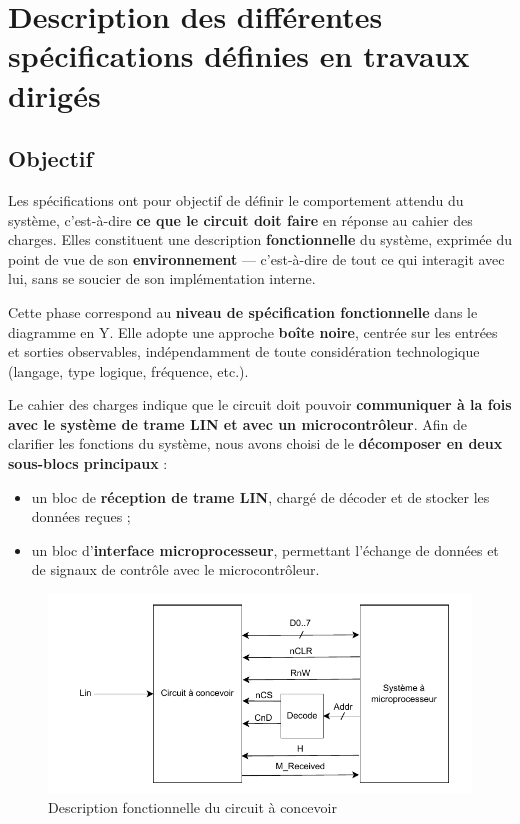 \section{Description des différentes spécifications définies en travaux dirigés}

\subsection*{Objectif}

Les spécifications ont pour objectif de définir le comportement attendu du système, c’est-à-dire 
\textbf{ce que le circuit doit faire} en réponse au cahier des charges. 
Elles constituent une description \textbf{fonctionnelle} du système, exprimée du point de vue de son 
\textbf{environnement} — c’est-à-dire de tout ce qui interagit avec lui, sans se soucier de son 
implémentation interne.

\medskip

Cette phase correspond au \textbf{niveau de spécification fonctionnelle} dans le diagramme en Y. 
Elle adopte une approche \textbf{boîte noire}, centrée sur les entrées et sorties observables, 
indépendamment de toute considération technologique (langage, type logique, fréquence, etc.).

\medskip

Le cahier des charges indique que le circuit doit pouvoir \textbf{communiquer à la fois avec le système 
de trame LIN et avec un microcontrôleur}. 
Afin de clarifier les fonctions du système, nous avons choisi de le \textbf{décomposer en deux sous-blocs principaux} :
\begin{itemize}
    \item un bloc de \textbf{réception de trame LIN}, chargé de décoder et de stocker les données reçues ;
    \item un bloc d’\textbf{interface microprocesseur}, permettant l’échange de données et de signaux de contrôle avec le microcontrôleur.
\end{itemize}

\begin{figure}[H]
   \centering
   \includegraphics[width=0.8\linewidth]{images/CDC/Schema_cdc_final.pdf}
   \caption{Description fonctionnelle du circuit à concevoir}
   \label{fig:placeholder}
\end{figure}

